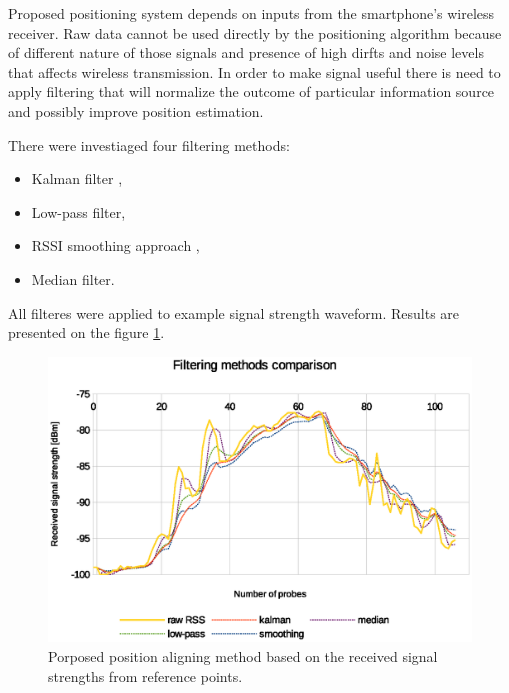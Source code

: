 \documentclass[../main.tex]{subfiles}
\begin{document}
Proposed positioning system depends on inputs from the smartphone's wireless receiver. Raw data cannot be used directly by the positioning algorithm because of different nature of those signals and presence of high dirfts and noise levels that affects wireless transmission. In order to make signal useful there is need to apply filtering that will normalize the outcome of particular information source and possibly improve position estimation.

There were investiaged four filtering methods:
\begin{itemize}
	\item Kalman filter \cite{article_rss_kalman},
	\item Low-pass filter,
	\item RSSI smoothing approach \cite{rssi_smoothing},
	\item Median filter.
\end{itemize}

All filteres were applied to example signal strength waveform. Results are presented on the figure \ref{fig:filtering_comparison}.

\begin{figure}[!htbp]
\includegraphics[width=\textwidth]{pictures/filtering_comparison}
\centering
\caption{Porposed position aligning method based on the received signal strengths from reference points.}
\label{fig:filtering_comparison}
\end{figure}
\end{document}
